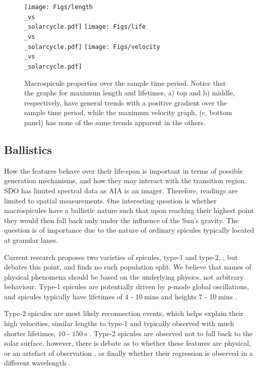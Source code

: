 \begin{figure}[h]
	\centering
	\texttt{[image: Figs/length\\\_vs\\\_solarcycle.pdf]}
	\texttt{[image: Figs/life\\\_vs\\\_solarcycle.pdf]}
	\texttt{[image: Figs/velocity\\\_vs\\\_solarcycle.pdf]}
	\caption{\small Macrospicule properties over the sample time period. Notice that the graphs for maximum length and lifetimes, a) top and b) middle, respectively, have general trends with a positive gradient over the sample time period, while the maximum velocity graph, (c, bottom panel) has none of the same trends apparent in the others.}
	\label{fig:sol-cyc-rels}
\end{figure}


\subsection{Ballistics}
How the features behave over their life-span is important in terms of possible generation mechanisms, and how they may interact with the transition region. SDO has limited spectral data as AIA is an imager. Therefore, readings are limited to spatial measurements. One interesting question is whether macrospicules have a ballistic nature such that upon reaching their highest point they would then fall back only under the influence of the Sun's gravity. The question is of importance due to the nature of ordinary spicules typically located at granular lanes.

Current research proposes two varieties of spicules, type-1 and type-2, \cite{Pereira2012}, but \cite{Zhang2012} debates this point, and finds no such population split. We believe that names of physical phenomena should be based on the underlying physics, not arbitrary behaviour. Type-1 spicules are potentially driven by \emph{p}-mode global oscillations, and spicules typically have lifetimes of $4$ - $10\ \textrm{mins}$ and heights $7$ - $10\ \textrm{mins}$ \cite{dePontieu&Erdelyi2004}.

Type-2 spicules are most likely reconnection events, which helps explain their high velocities, similar lengths to type-1 and typically observed with much shorter lifetimes, $10$ - $150\ \textrm{s}$ \cite{Isobe2008}. Type-2 spicules are observed not to fall back to the solar surface, however, there is debate as to whether these features are physical, or an artefact of observation \cite{Tsiropoula2012}, \cite{Sekse2013} or finally whether their regression is observed in a different wavelength \cite{Pereira2014}.

